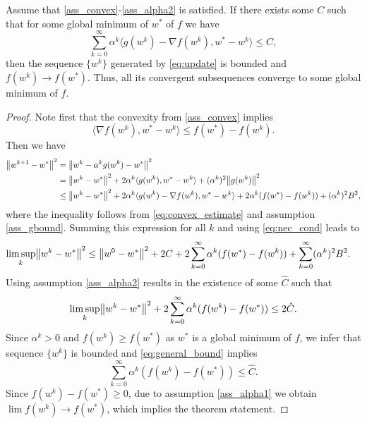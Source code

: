 \begin{theorem}\label{thm:convergence}
  Assume that \ref{ass_convex}-\ref{ass_alpha2} is satisfied. If there exists some $C$ such that for some global minimum of $w^*$ of $f$ we have
  \begin{equation}\label{eq:nec_cond}
    \sum_{k=0}^\infty\alpha^k\langle g(w^k)-\nabla f(w^k),w^*-w^k\rangle\le C,
  \end{equation}
  then the sequence $\{w^k\}$ generated by \eqref{eq:update} is bounded and $f(w^k)\to f(w^*)$. Thus, all its convergent subsequences converge to some global minimum of $f$.
\end{theorem}
\begin{proof}
  Note first that the convexity from \ref{ass_convex} implies
  \begin{equation}\label{eq:convex_estimate}
    \langle \nabla f(w^k),w^*-w^k\rangle\le f(w^*)-f(w^k).
  \end{equation}
  Then we have
  $$
  \begin{aligned}
  \norm{w^{k+1}-w^*}^2 &= \norm{w^k-\alpha^kg(w^k)-w^*}^2 \\
  &=\norm{w^k-w^*}^2 + 2\alpha^k\langle g(w^k),w^*-w^k\rangle + (\alpha^k)^2\norm{g(w^k)}^2 \\
  &\le \norm{w^k-w^*}^2 + 2\alpha^k\langle g(w^k)-\nabla f(w^k),w^*-w^k\rangle + 2\alpha^k(f(w^*)-f(w^k)) + (\alpha^k)^2B^2,
  \end{aligned}
  $$
  where the inequality follows from \eqref{eq:convex_estimate} and assumption \ref{ass_gbound}. Summing this expression for all $k$ and using \eqref{eq:nec_cond} leads to
  $$
  \begin{aligned}
  \limsup_k\norm{w^k-w^*}^2 &\le \norm{w^0-w^*}^2 +2C + 2\sum_{k=0}^\infty\alpha^k(f(w^*)-f(w^k)) + \sum_{k=0}^\infty(\alpha^k)^2B^2.
  \end{aligned}
  $$
  Using assumption \ref{ass_alpha2} results in the existence of some $\hat C$ such that
  \begin{equation}\label{eq:general_bound}
  \limsup_k\norm{w^k-w^*}^2 + 2\sum_{k=0}^\infty\alpha^k(f(w^k) - f(w^*)) \le 2\hat C.
  \end{equation}
  Since $\alpha^k>0$ and $f(w^k)\ge f(w^*)$ as $w^*$ is a global minimum of $f$, we infer that sequence $\{w^k\}$ is bounded and \eqref{eq:general_bound} implies
  $$
  \sum_{k=0}^\infty\alpha^k(f(w^k) - f(w^*)) \le \hat C.
  $$
  Since $f(w^k)-f(w^*)\ge 0$, due to assumption \ref{ass_alpha1} we obtain $\lim f(w^k)\to f(w^*)$, which implies the theorem statement.
\end{proof}

